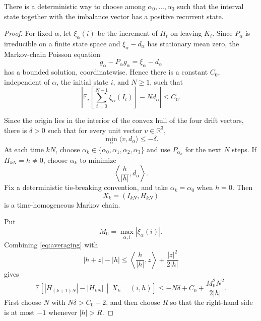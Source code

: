 \documentclass[10pt,a4paper]{amsart}
\begin{document}
\begin{lemma}\label{lem:recurrence}
There is a deterministic way to choose among $\alpha_0,\ldots,\alpha_3$ such that the interval state together with the imbalance vector has a positive recurrent state.
\end{lemma}

\begin{proof}
For fixed $\alpha$, let $\xi_\alpha(i)$ be the increment of $H_t$ on leaving $K_i$. Since $P_\alpha$ is irreducible on a finite state space and $\xi_\alpha-d_\alpha$ has stationary mean zero, the Markov-chain Poisson equation
\[
g_\alpha-P_\alpha g_\alpha=\xi_\alpha-d_\alpha
\]
has a bounded solution, coordinatewise. Hence there is a constant $C_0$, independent of $\alpha$, the initial state $i$, and $N\geq1$, such that
\begin{equation}\label{eq:averaging}
\left|
\mathbb E_i\left[\sum_{t=0}^{N-1}\xi_\alpha(I_t)\right]-Nd_\alpha
\right|\leq C_0.
\end{equation}

Since the origin lies in the interior of the convex hull of the four drift vectors, there is $\delta>0$ such that for every unit vector $v\in\mathbb R^3$,
\[
\min_\alpha\langle v,d_\alpha\rangle\leq-\delta.
\]
At each time $kN$, choose $\alpha_k\in\{\alpha_0,\alpha_1,\alpha_2,\alpha_3\}$ and use $P_{\alpha_k}$ for the next $N$ steps. If $H_{kN}=h\neq0$, choose $\alpha_k$ to minimize
\[
\left\langle \frac{h}{|h|},d_\alpha\right\rangle.
\]
Fix a deterministic tie-breaking convention, and take $\alpha_k=\alpha_0$ when $h=0$. Then
\[
X_k=(I_{kN},H_{kN})
\]
is a time-homogeneous Markov chain.

Put
\[
M_0=\max_{\alpha,i}|\xi_\alpha(i)|.
\]
Combining \eqref{eq:averaging} with
\[
|h+z|-|h|\leq \left\langle\frac h{|h|},z\right\rangle+\frac{|z|^2}{2|h|}
\]
gives
\[
\mathbb E\left[
|H_{(k+1)N}|-|H_{kN}|
\,\middle|\,
X_k=(i,h)
\right]
\leq-N\delta+C_0+\frac{M_0^2N^2}{2|h|}.
\]
First choose $N$ with $N\delta>C_0+2$, and then choose $R$ so that the right-hand side is at most $-1$ whenever $|h|>R$.


\end{proof}
\end{document}
